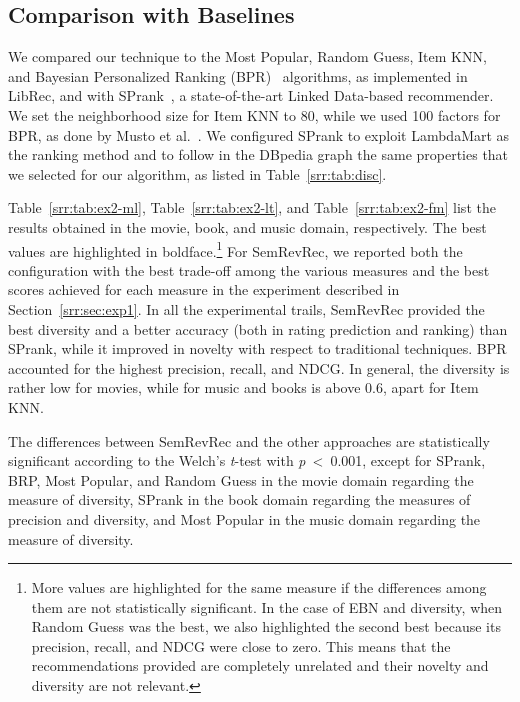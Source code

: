 \subsection{Comparison with Baselines}
\label{srr:sec:exp2}

We compared our technique to the Most Popular, Random Guess, Item KNN, and Bayesian Personalized Ranking (BPR)~\cite{Rendle2009} algorithms, as implemented in LibRec, and with SPrank~\cite{DiNoia2016}, a state-of-the-art Linked Data-based recommender. We set the neighborhood size for Item KNN to 80, while we used 100 factors for BPR, as done by Musto et al.~\cite{Musto2016}. We configured SPrank to exploit LambdaMart as the ranking method and to follow in the DBpedia graph the same properties that we selected for our algorithm, as listed in Table~\ref{srr:tab:disc}.

Table~\ref{srr:tab:ex2-ml}, Table~\ref{srr:tab:ex2-lt}, and Table~\ref{srr:tab:ex2-fm} list the results obtained in the movie, book, and music domain, respectively. The best values are highlighted in boldface.\footnote{More values are highlighted for the same measure if the differences among them are not statistically significant. In the case of EBN and diversity, when Random Guess was the best, we also highlighted the second best because its precision, recall, and NDCG were close to zero. This means that the recommendations provided are completely unrelated and their novelty and diversity are not relevant.} For SemRevRec, we reported both the configuration with the best trade-off among the various measures and the best scores achieved for each measure in the experiment described in Section~\ref{srr:sec:exp1}. In all the experimental trails, SemRevRec provided the best diversity and a better accuracy (both in rating prediction and ranking) than SPrank, while it improved in novelty with respect to traditional techniques. BPR accounted for the highest precision, recall, and NDCG. In general, the diversity is rather low for movies, while for music and books is above 0.6, apart for Item KNN.

The differences between SemRevRec and the other approaches are statistically significant according to the Welch's \emph{t}-test with \emph{p}~<~0.001, except for SPrank, BRP, Most Popular, and Random Guess in the movie domain regarding the measure of diversity, SPrank in the book domain regarding the measures of precision and diversity, and Most Popular in the music domain regarding the measure of diversity.


